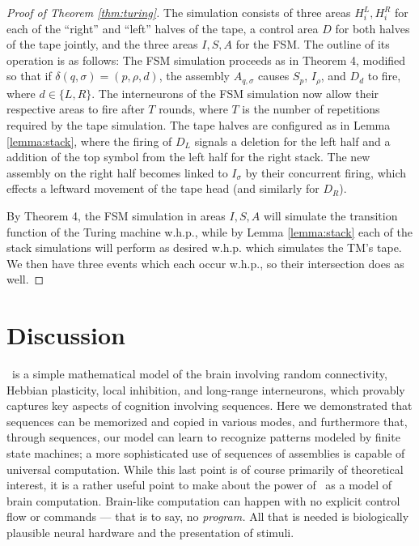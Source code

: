 \documentclass[12pt,nosubfloats]{alt2024} %
\newcommand{\1}{\mathbbm{1}}
\begin{document}
\begin{proof}[Proof of Theorem \ref{thm:turing}]
    The simulation consists of three areas $H_i^L, H_i^R$ for each of the ``right'' and ``left'' halves of the tape, a control area $D$ for both halves of the tape jointly, and the three areas $I, S, A$ for the FSM. The outline of its operation is as follows: The FSM simulation proceeds as in Theorem 4, modified so that if $\delta(q, \sigma) = (p, \rho, d)$, the assembly $A_{q, \sigma}$ causes $S_p$, $I_\rho$, and $D_d$ to fire, where $d \in \{L, R\}$. The interneurons of the FSM simulation now allow their respective areas to fire after $T$ rounds, where $T$ is the number of repetitions required by the tape simulation. The tape halves are configured as in Lemma \ref{lemma:stack}, where the firing of $D_L$ signals a deletion for the left half and a addition of the top symbol from the left half for the right stack. The new assembly on the right half becomes linked to $I_\sigma$ by their concurrent firing, which effects a leftward movement of the tape head (and similarly for $D_R$).

    By Theorem 4, the FSM simulation in areas $I, S, A$ will simulate the transition function of the Turing machine w.h.p., while by Lemma \ref{lemma:stack} each of the stack simulations will perform as desired w.h.p. which simulates the TM's tape. We then have three events which each occur w.h.p., so their intersection does as well.
\end{proof}

\section{Discussion}
\name\ is a simple mathematical model of the brain involving random connectivity, Hebbian plasticity, local inhibition, and long-range interneurons, which provably captures key aspects of cognition involving sequences.  Here we demonstrated that sequences can be memorized and copied in various modes, and furthermore that, through sequences, our model can learn to recognize patterns modeled by finite state machines; a more sophisticated use of sequences of assemblies is capable of universal computation.  While this last point is of course primarily of theoretical interest, it is a rather useful point to make about the power of \name\ as a model of brain computation.   Brain-like computation can happen with no explicit control flow or commands --- that is to say, no {\em program.}  All that is needed is biologically plausible neural hardware and the presentation of stimuli.
\end{document}
